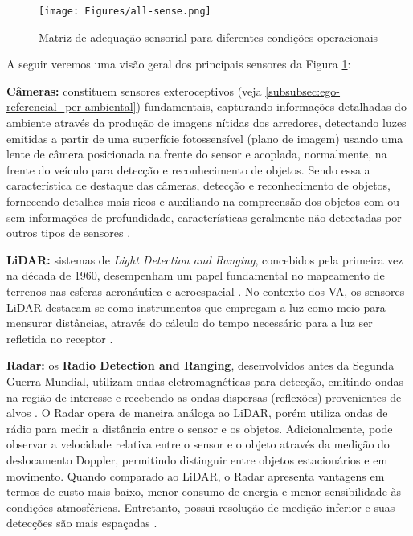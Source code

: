 \begin{figure}[H]
\centering
\texttt{[image: Figures/all-sense.png]}
\caption{Matriz de adequação sensorial para diferentes condições operacionais \cite[p. ~6]{sensors-yet}}
\label{all-sense}
\end{figure}

A seguir veremos uma visão geral dos principais sensores da Figura \ref{all-sense}:

\textbf{Câmeras:} constituem sensores exteroceptivos (veja \ref{subsubsec:ego-referencial_per-ambiental}) fundamentais, capturando informações detalhadas do ambiente através da produção de imagens nítidas dos arredores, detectando luzes emitidas a partir de uma superfície fotossensível (plano de imagem) usando uma lente de câmera posicionada na frente do sensor \cite[p. ~738]{sensors} e acoplada, normalmente, na frente do veículo para detecção e reconhecimento de objetos. Sendo essa a característica de destaque das câmeras, detecção e reconhecimento de objetos, fornecendo detalhes mais ricos e auxiliando na compreensão dos objetos com ou sem informações de profundidade, características geralmente não detectadas por outros tipos de sensores \cite[p. ~4]{yao2023radar}.

\textbf{LiDAR:} sistemas de \textit{Light Detection and Ranging}, concebidos pela primeira vez na década de 1960, desempenham um papel fundamental no mapeamento de terrenos nas esferas aeronáutica e aeroespacial \cite[p. ~738]{sensors}. No contexto dos VA, os sensores LiDAR destacam-se como instrumentos que empregam a luz como meio para mensurar distâncias, através do cálculo do tempo necessário para a luz ser refletida no receptor \cite[p. ~1911]{mao20233d}.

\textbf{Radar:} os \textbf{Radio Detection and Ranging}, desenvolvidos antes da Segunda Guerra Mundial, utilizam ondas eletromagnéticas para detecção, emitindo ondas na região de interesse e recebendo as ondas dispersas (reflexões) provenientes de alvos \cite[p. ~738]{sensors}. O Radar opera de maneira análoga ao LiDAR, porém utiliza ondas de rádio para medir a distância entre o sensor e os objetos. Adicionalmente, pode observar a velocidade relativa entre o sensor e o objeto através da medição do deslocamento Doppler, permitindo distinguir entre objetos estacionários e em movimento. Quando comparado ao LiDAR, o Radar apresenta vantagens em termos de custo mais baixo, menor consumo de energia e menor sensibilidade às condições atmosféricas. Entretanto, possui resolução de medição inferior e suas detecções são mais espaçadas \cite[p. ~8]{zheng2023simultaneous}.

